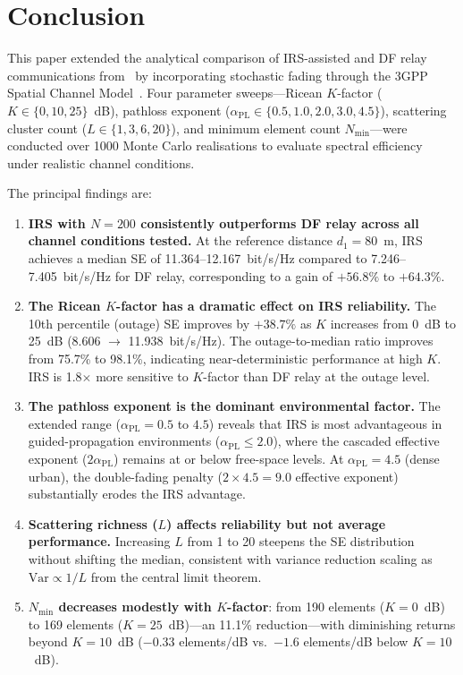 \documentclass[journal]{IEEEtran} %
\begin{document}
\section{Conclusion}
\label{sec:conclusion}

This paper extended the analytical comparison of IRS-assisted and DF relay communications from~\cite{bjornson2020irs} by incorporating stochastic fading through the 3GPP Spatial Channel Model~\cite{etsi125996}. Four parameter sweeps---Ricean $K$-factor ($K \in \{0, 10, 25\}$~dB), pathloss exponent ($\alpha_{\mathrm{PL}} \in \{0.5, 1.0, 2.0, 3.0, 4.5\}$), scattering cluster count ($L \in \{1, 3, 6, 20\}$), and minimum element count $N_{\mathrm{min}}$---were conducted over 1000 Monte Carlo realisations to evaluate spectral efficiency under realistic channel conditions.

The principal findings are:

\begin{enumerate}
    \item \textbf{IRS with $N = 200$ consistently outperforms DF relay across all channel conditions tested.} At the reference distance $d_1 = 80$~m, IRS achieves a median SE of 11.364--12.167~bit/s/Hz compared to 7.246--7.405~bit/s/Hz for DF relay, corresponding to a gain of $+56.8\%$ to $+64.3\%$.

    \item \textbf{The Ricean $K$-factor has a dramatic effect on IRS reliability.} The 10th percentile (outage) SE improves by $+38.7\%$ as $K$ increases from 0~dB to 25~dB (8.606 $\to$ 11.938~bit/s/Hz). The outage-to-median ratio improves from 75.7\% to 98.1\%, indicating near-deterministic performance at high $K$. IRS is 1.8$\times$ more sensitive to $K$-factor than DF relay at the outage level.

    \item \textbf{The pathloss exponent is the dominant environmental factor.} The extended range ($\alpha_{\mathrm{PL}} = 0.5$ to $4.5$) reveals that IRS is most advantageous in guided-propagation environments ($\alpha_{\mathrm{PL}} \leq 2.0$), where the cascaded effective exponent ($2\alpha_{\mathrm{PL}}$) remains at or below free-space levels. At $\alpha_{\mathrm{PL}} = 4.5$ (dense urban), the double-fading penalty ($2 \times 4.5 = 9.0$ effective exponent) substantially erodes the IRS advantage.

    \item \textbf{Scattering richness ($L$) affects reliability but not average performance.} Increasing $L$ from 1 to 20 steepens the SE distribution without shifting the median, consistent with variance reduction scaling as $\mathrm{Var} \propto 1/L$ from the central limit theorem.

    \item \textbf{$N_{\mathrm{min}}$ decreases modestly with $K$-factor}: from 190 elements ($K = 0$~dB) to 169 elements ($K = 25$~dB)---an 11.1\% reduction---with diminishing returns beyond $K = 10$~dB ($-0.33$ elements/dB vs.\ $-1.6$ elements/dB below $K = 10$~dB).
\end{enumerate}
\end{document}
